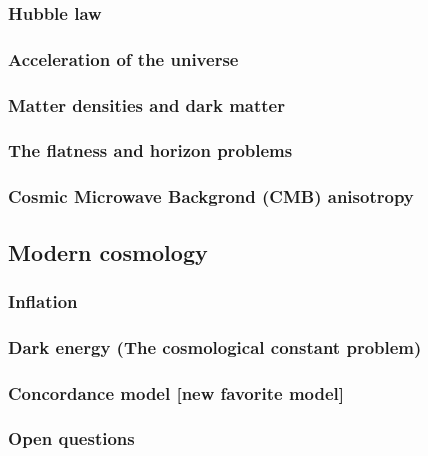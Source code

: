 \documentclass{article}
\theoremstyle{definition}
\begin{document}
\subsubsection{Hubble law}
\subsubsection{Acceleration of the universe}
\subsubsection{Matter densities and dark matter}
\subsubsection{The flatness and horizon problems}
\subsubsection{Cosmic Microwave Backgrond (CMB) anisotropy}
\subsection{Modern cosmology}
\subsubsection{Inflation}
\subsubsection{Dark energy (The cosmological constant problem)}
\subsubsection{Concordance model [new favorite model]}
\subsubsection{Open questions}

\newpage
 
\end{document}
